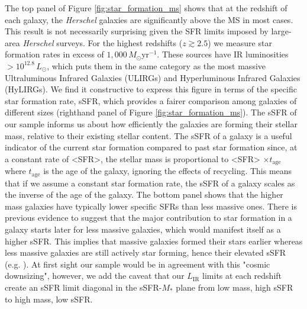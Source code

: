 The top panel of Figure \ref{fig:star_formation_ms} shows that at the redshift of each galaxy, the \textit{Herschel} galaxies are significantly above the MS in most cases. This result is not necessarily surprising given the SFR limits imposed by large-area \textit{Herschel} surveys. For the highest redshifts ($z \gtrsim 2.5$) we measure star formation rates in excess of $1,000\,M_\odot$yr$^{-1}$. These sources have IR luminosities $> 10^{12.8}\,L_\odot$, which puts them in the same category as the most massive Ultraluminous Infrared Galaxies (ULIRGs) and Hyperluminous Infrared Galaxies (HyLIRGs). We find it constructive to express this figure in terms of the specific star formation rate, sSFR, which provides a fairer comparison among galaxies of different sizes (righthand panel of Figure \ref{fig:star_formation_ms}). The sSFR of our sample informs us about how efficiently the galaxies are forming their stellar mass, relative to their existing stellar content. The sSFR of a galaxy is a useful indicator of the current star formation compared to past star formation since, at a constant rate of <SFR>, the stellar mass is proportional to <SFR> $\times t_{\textrm{age}}$ where $t_{\textrm{age}}$ is the age of the galaxy, ignoring the effects of recycling. This means that if we assume a constant star formation rate, the sSFR of a galaxy scales as the inverse of the age of the galaxy. The bottom panel shows that the higher mass galaxies have typically lower specific SFRs than less massive ones. There is previous evidence to suggest that the major contribution to star formation in a galaxy starts later for less massive galaxies, which would manifest itself as a higher sSFR. This implies that massive galaxies formed their stars earlier whereas less massive galaxies are still actively star forming, hence their elevated sSFR (e.g. \citealt{Brinchmann_2000, Juneau_2005, Bell_2005, Caputi_2006, Reddy_2006, Noeske_2007}). At first sight our sample would be in agreement with this "cosmic downsizing", however, we add the caveat that our $L_{\textrm{IR}}$ limits at each redshift create an sSFR limit diagonal in the sSFR-$M_*$ plane from low mass, high sSFR to high mass, low sSFR.

